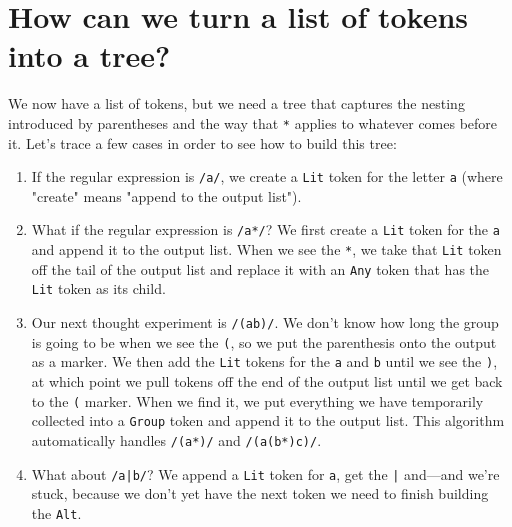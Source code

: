 \documentclass[krantzl]{krantz}
\begin{document}
\section{How can we turn a list of tokens into a tree?}\label{regex-parser-tree}


We now have a list of tokens,
but we need a tree that captures the nesting introduced by parentheses
and the way that \texttt{*} applies to whatever comes before it.
Let's trace a few cases in order to see how to build this tree:

\begin{enumerate}

\item 

If the regular expression is \texttt{/a/}, we create a \texttt{Lit} token for the letter \texttt{a}
    (where "create" means "append to the output list").



\item 

What if the regular expression is \texttt{/a*/}?
    We first create a \texttt{Lit} token for the \texttt{a} and append it to the output list.
    When we see the \texttt{*},
    we take that \texttt{Lit} token off the tail of the output list
    and replace it with an \texttt{Any} token that has the \texttt{Lit} token as its child.



\item 

Our next thought experiment is \texttt{/(ab)/}.
    We don't know how long the group is going to be when we see the \texttt{(},
    so we put the parenthesis onto the output as a marker.
    We then add the \texttt{Lit} tokens for the \texttt{a} and \texttt{b}
    until we see the \texttt{)},
    at which point we pull tokens off the end of the output list
    until we get back to the \texttt{(} marker.
    When we find it,
    we put everything we have temporarily collected into a \texttt{Group} token and append it to the output list.
    This algorithm automatically handles \texttt{/(a*)/} and \texttt{/(a(b*)c)/}.



\item 

What about \texttt{/a|b/}?
    We append a \texttt{Lit} token for \texttt{a}, get the \texttt{|} and---and we're stuck,
    because we don't yet have the next token we need to finish building the \texttt{Alt}.



\end{enumerate}
\end{document}

